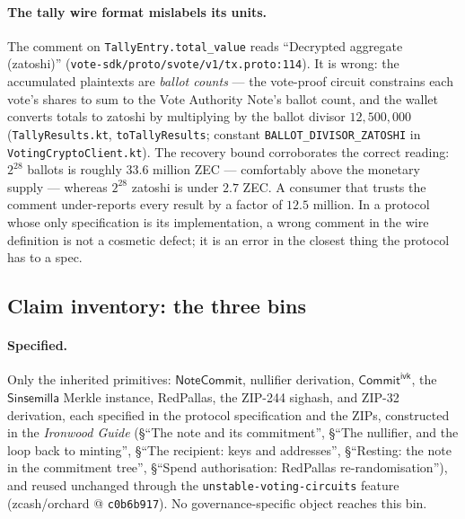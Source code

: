 \documentclass[11pt,a4paper]{article}
\theoremstyle{definition}
\newcommand{\NoteCommit}{\ensuremath{\mathsf{NoteCommit}}}
\newcommand{\Sinsemilla}{\ensuremath{\mathsf{Sinsemilla}}}
\newcommand{\CommitIvk}{\ensuremath{\mathsf{Commit}^{\mathsf{ivk}}}}
\begin{document}
\paragraph{The tally wire format mislabels its units.} The comment on
\texttt{TallyEntry.total\_value} reads ``Decrypted aggregate (zatoshi)''
(\texttt{vote-sdk/proto/svote/v1/tx.proto:114}). It is wrong: the
accumulated plaintexts are \emph{ballot counts} --- the vote-proof circuit
constrains each vote's shares to sum to the Vote Authority Note's ballot
count, and the wallet converts totals to zatoshi by multiplying by the
ballot divisor $12{,}500{,}000$ (\texttt{TallyResults.kt},
\texttt{toTallyResults}; constant \texttt{BALLOT\_DIVISOR\_ZATOSHI} in
\texttt{VotingCryptoClient.kt}). The recovery bound corroborates the
correct reading: $2^{28}$ ballots is roughly $33.6$ million ZEC ---
comfortably above the monetary supply --- whereas $2^{28}$ zatoshi is
under $2.7$ ZEC. A consumer that trusts the comment under-reports every
result by a factor of $12.5$ million. In a protocol whose only
specification is its implementation, a wrong comment in the wire
definition is not a cosmetic defect; it is an error in the closest thing
the protocol has to a spec.

\subsection{Claim inventory: the three bins}\label{sec:vote-inventory}

\paragraph{Specified.} Only the inherited primitives: \NoteCommit{},
nullifier derivation, \CommitIvk{}, the \Sinsemilla{} Merkle instance,
RedPallas, the ZIP-244 sighash, and ZIP-32 derivation, each specified in
the protocol specification and the ZIPs, constructed in the \emph{Ironwood
Guide} (\S``The note and its commitment'',
\S``The nullifier, and the loop back to minting'', \S``The recipient: keys and
addresses'', \S``Resting: the note in the commitment tree'', \S``Spend
authorisation: RedPallas re-randomisation''), and reused unchanged through the
\texttt{unstable-voting-circuits} feature (zcash/orchard @
\texttt{c0b6b917}). No governance-specific object reaches this bin.
\end{document}

